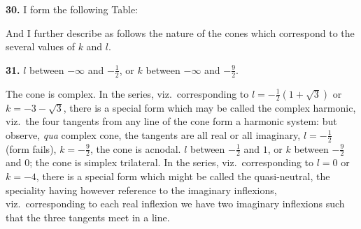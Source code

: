 \documentclass[11pt,a4paper]{article}
\begin{document}
\textbf{30.} I form the following Table:
\begin{center}
\renewcommand{\arraystretch}{1.35}
\end{center}

And I further describe as follows the nature of the cones which correspond to the several values of $k$ and $l$.

\textbf{31.} $l$ between $-\infty$ and $-\tfrac{1}{2}$, or $k$ between $-\infty$ and $-\tfrac{9}{2}$.

The cone is complex. In the series, viz.\ corresponding to $l = -\tfrac{1}{2}(1 + \sqrt{3})$ or $k = -3 - \sqrt{3}$, there is a special form which may be called the complex harmonic, viz.\ the four tangents from any line of the cone form a harmonic system: but observe, \textit{qua} complex cone, the tangents are all real or all imaginary, $l = -\tfrac{1}{2}$ (form fails), $k = -\tfrac{9}{2}$, the cone is acnodal. $l$ between $-\tfrac{1}{2}$ and $1$, or $k$ between $-\tfrac{9}{2}$ and $0$; the cone is simplex trilateral. In the series, viz.\ corresponding to $l = 0$ or $k = -4$, there is a special form which might be called the quasi-neutral, the speciality having however reference to the imaginary inflexions, viz.\ corresponding to each real inflexion we have two imaginary inflexions such that the three tangents meet in a line.
\end{document}
